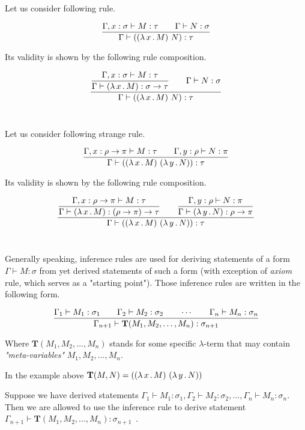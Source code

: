 \documentclass[12pt,a4paper]{report}
\newcommand{\Lets}{Let us\xspace}
\newcommand{\lterm}{$\lambda$-term\xspace}
\newcommand{\tur}[3]{#1\vdash{}#2:#3}
\newcommand{\turst}[3]{$#1\vdash{}#2:#3$\xspace}
\newcommand{\GMS}{\turst{\Gamma}{M}{\sigma}}
\begin{document}
\Lets consider following rule.

$$
\ruleII
 { \tur{\Gamma,x:\sigma}{M}{\tau} }
 { \tur{\Gamma}{N}{\sigma} }
 { \tur{\Gamma}{(\lamb{x}{M}~N)}{\tau} }
$$

Its validity is shown by the following rule composition.

$$
\ruleII
	{ \ruleI 
	     { \tur{\Gamma,x:\sigma}{M}{\tau} }
	     { \tur{\Gamma}{\lamb{x}{M}}{\sigma \ar \tau} }
	}
	{ \tur{\Gamma}{N}{\sigma} }
	{ \tur{\Gamma}{(\lamb{x}{M}~N)}{\tau} }
$$~






\Lets consider following strange rule.

$$
\ruleII
 { \tur{\Gamma,x:\rho \ar \pi}{M}{\tau} }
 { \tur{\Gamma,y:\rho}{N}{\pi} }
 { \tur{\Gamma}{(\lamb{x}{M}~\lamb{y}{N})}{\tau} }
$$

Its validity is shown by the following rule composition.

$$
\ruleII
	{ \ruleI 
	     { \tur{\Gamma,x:\rho \ar \pi}{M}{\tau} }
	     { \tur{\Gamma}{\lamb{x}{M}}{(\rho \ar \pi) \ar \tau} }
	}
	{ \ruleI 
	     { \tur{\Gamma,y:\rho}{N}{\pi} }
	     { \tur{\Gamma}{\lamb{y}{N}}{\rho \ar \pi} }
	}	 { \tur{\Gamma}{(\lamb{x}{M}~\lamb{y}{N})}{\tau} }
$$~




	
	
Generally speaking, inference rules are used for deriving statements of a form 
\GMS from yet derived statements of such a form (with exception of 
\textit{axiom} rule, which serves as a "starting point").
Those inference rules are written in the following form.

$$ 
\ruleIV
  { \tur{\Gamma_1}{M_1}{\sigma_1} }
  { \tur{\Gamma_2}{M_2}{\sigma_2} }
  { \dotsm }
  { \tur{\Gamma_n}{M_n}{\sigma_n} }
  { \tur{\Gamma_{n+1}}{ \mathbf{T}(M_1,M_2,\dots,M_n)}{\sigma_{n+1}} } 
$$

Where $\mathbf{T}(M_1,M_2,\dots,M_n)$ stands for some 
specific \lterm that may contain \textit{"meta-variables"}
$M_1,M_2,\dots,M_n$. 

In the example above $\mathbf{T}(M,N) = (( \lambda \, x \, . \, M )~( \lambda \, y \, . \, N ))$

Suppose we have derived statements 
$\Gamma_1 \vdash M_1 : \sigma_1 ,
 \Gamma_2 \vdash M_2 : \sigma_2 ,
 \dots ,
 \Gamma_n \vdash M_n : \sigma_n$. 
Then we are allowed to use the inference rule to derive statement
\mbox{ $\Gamma_{n+1} \vdash \mathbf{T}(M_1,M_2,\dots,M_n) : \sigma_{n+1}$ }.\\
 
\end{document}
